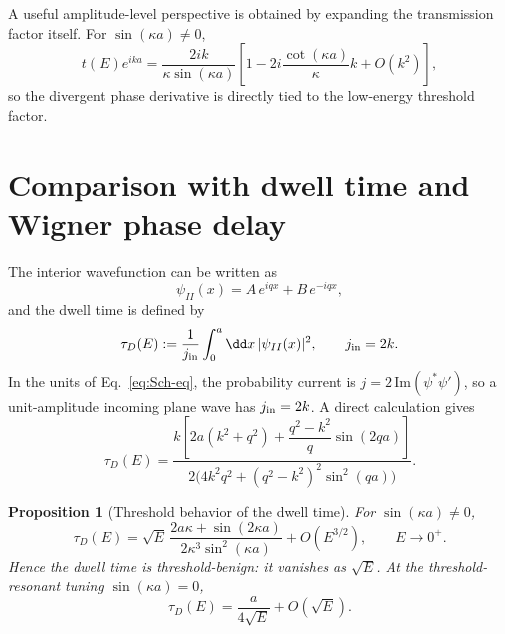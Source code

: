 \documentclass[aps,pra,preprint,notitlepage,nofootinbib]{revtex4-2}
\newtheorem{proposition}{Proposition}
\begin{document}
A useful amplitude-level perspective is obtained by expanding the transmission factor itself. For $\sin(\kappa a)\neq 0$,
\begin{equation}
t(E)e^{ika}
=
\frac{2ik}{\kappa\sin(\kappa a)}
\left[
1-2i\frac{\cot(\kappa a)}{\kappa}k+O(k^2)
\right],
\label{eq:amp-threshold-expansion}
\end{equation}
so the divergent phase derivative is directly tied to the low-energy threshold factor.

\section{Comparison with dwell time and Wigner phase delay}
\label{sec:comparison}

The interior wavefunction can be written as
\begin{equation}
\psi_{II}(x)=A\,e^{iqx}+B\,e^{-iqx},
\label{eq:psiII-def}
\end{equation}
and the dwell time is defined by~\cite{Smith1960}
\begin{equation}
\tau_D(E):=\frac{1}{j_{\rm in}}\int_0^a \dd x\,|\psi_{II}(x)|^2,
\qquad j_{\rm in}=2k.
\label{eq:tauD-def}
\end{equation}
In the units of Eq.~\eqref{eq:Sch-eq}, the probability current is
$j=2\,\mathrm{Im}(\psi^*\psi')$, so a unit-amplitude incoming plane wave has
$j_{\rm in}=2k$. A direct calculation gives
\begin{equation}
\tau_D(E)=
\frac{
 k\left[2a(k^2+q^2)+\dfrac{q^2-k^2}{q}\sin(2qa)\right]
}{
 2\Big(4k^2q^2+(q^2-k^2)^2\sin^2(qa)\Big)
}.
\label{eq:tauD-exact}
\end{equation}

\begin{proposition}[Threshold behavior of the dwell time]
For $\sin(\kappa a)\neq 0$,
\begin{equation}
\tau_D(E)=
\sqrt{E}\,
\frac{2a\kappa+\sin(2\kappa a)}
{2\kappa^3\sin^2(\kappa a)}
+O(E^{3/2}),
\qquad E\to0^+.
\label{eq:tauD-threshold}
\end{equation}
Hence the dwell time is threshold-benign: it vanishes as $\sqrt{E}$. At the threshold-resonant tuning $\sin(\kappa a)=0$,
\begin{equation}
\tau_D(E)=\frac{a}{4\sqrt{E}}+O(\sqrt{E}).
\label{eq:tauD-halfbound}
\end{equation}
\end{proposition}
\end{document}
